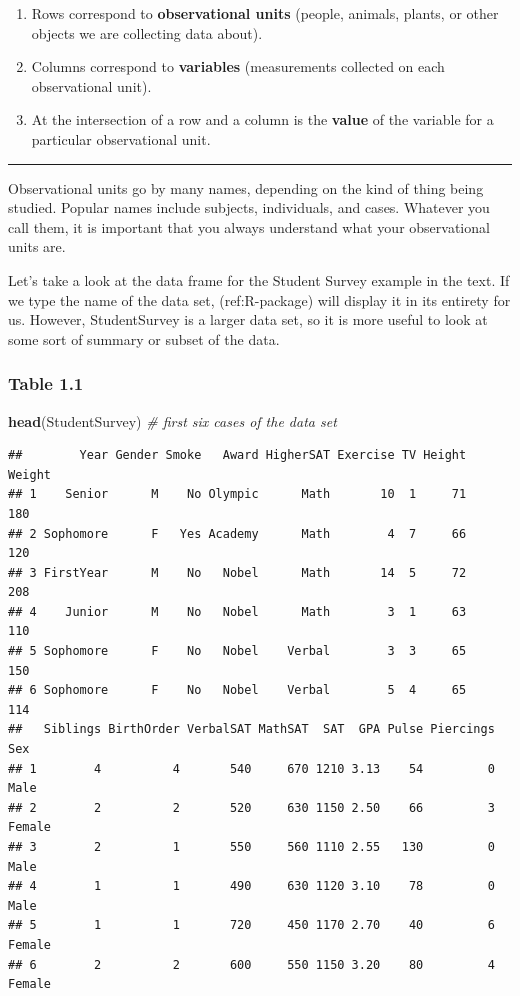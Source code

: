 \documentclass[]{book}
\newenvironment{Shaded}{\begin{snugshade}}{\end{snugshade}}
\newcommand{\CommentTok}[1]{\textcolor[rgb]{0.56,0.35,0.01}{\textit{#1}}}
\newcommand{\KeywordTok}[1]{\textcolor[rgb]{0.13,0.29,0.53}{\textbf{#1}}}
\newcommand{\NormalTok}[1]{#1}
\providecommand{\tightlist}{%
  \setlength{\itemsep}{0pt}\setlength{\parskip}{0pt}}
\begin{document}
\begin{enumerate}
\tightlist
\item
  Rows correspond to \textbf{observational units} (people, animals, plants, or other objects we are collecting data about).
\item
  Columns correspond to \textbf{variables} (measurements collected on each observational unit).
\item
  At the intersection of a row and a column is the \textbf{value} of the variable for a particular observational unit.
\end{enumerate}

\begin{center}\rule{0.5\linewidth}{\linethickness}\end{center}

Observational units go by many names, depending on the kind of thing being studied. Popular names include subjects, individuals, and cases. Whatever you call them, it is important that you always understand what your observational units are.

Let's take a look at the data frame for the Student Survey example in the text. If we type the name of the data set, (ref:R-package) will display it in its entirety for us. However, {StudentSurvey} is a larger data set, so it is more useful to look at some sort of summary or subset of the data.

\hypertarget{table-1.1}{%
\subsubsection{Table 1.1}\label{table-1.1}}

\begin{Shaded}
\begin{Highlighting}[]
\KeywordTok{head}\NormalTok{(StudentSurvey) }\CommentTok{# first six cases of the data set}
\end{Highlighting}
\end{Shaded}

\begin{verbatim}
##        Year Gender Smoke   Award HigherSAT Exercise TV Height Weight
## 1    Senior      M    No Olympic      Math       10  1     71    180
## 2 Sophomore      F   Yes Academy      Math        4  7     66    120
## 3 FirstYear      M    No   Nobel      Math       14  5     72    208
## 4    Junior      M    No   Nobel      Math        3  1     63    110
## 5 Sophomore      F    No   Nobel    Verbal        3  3     65    150
## 6 Sophomore      F    No   Nobel    Verbal        5  4     65    114
##   Siblings BirthOrder VerbalSAT MathSAT  SAT  GPA Pulse Piercings    Sex
## 1        4          4       540     670 1210 3.13    54         0   Male
## 2        2          2       520     630 1150 2.50    66         3 Female
## 3        2          1       550     560 1110 2.55   130         0   Male
## 4        1          1       490     630 1120 3.10    78         0   Male
## 5        1          1       720     450 1170 2.70    40         6 Female
## 6        2          2       600     550 1150 3.20    80         4 Female
\end{verbatim}
\end{document}
